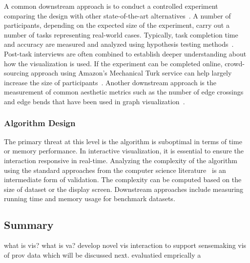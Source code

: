 A common downstream approach is to conduct a controlled experiment comparing the design with other state-of-the-art alternatives~\cite{Xu2012}. A number of participants, depending on the  expected size of the experiment, carry out a number of tasks representing real-world cases. Typically, task completion time and accuracy are measured and analyzed using hypothesis testing methods~\cite{Field2003}. Post-task interviews are often combined to establish deeper understanding about how the visualization is used. If the experiment can be completed online, crowd-sourcing approach using Amazon's Mechanical Turk service can help largely increase the size of participants~\cite{Heer2010a}. Another downstream approach is the measurement of common aesthetic metrics such as the number of edge crossings and edge bends that have been used in graph visualization~\cite{Sugiyama1981}.

\subsubsection{Algorithm Design}
The primary threat at this level is the algorithm is suboptimal in terms of time or memory performance. In interactive visualization, it is essential to ensure the interaction responsive in real-time. Analyzing the complexity of the algorithm using the standard approaches from the computer science literature~\cite{Cormen2009} is an intermediate form of validation. The complexity can be computed based on the size of dataset or the display screen. Downstream approaches include measuring running time and memory usage for benchmark datasets.


\subsection{Summary}
what is vis? what is va? develop novel vis interaction to support sensemaking vis of prov data which will be discussed next. evaluatied emprically a